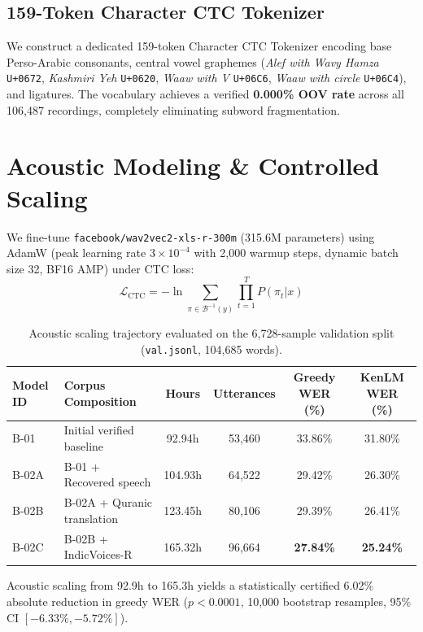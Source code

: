 \documentclass[11pt,a4paper]{article}
\begin{document}
\subsection{159-Token Character CTC Tokenizer}
We construct a dedicated 159-token Character CTC Tokenizer encoding base Perso-Arabic consonants, central vowel graphemes (\textit{Alef with Wavy Hamza} \texttt{U+0672}, \textit{Kashmiri Yeh} \texttt{U+0620}, \textit{Waaw with V} \texttt{U+06C6}, \textit{Waaw with circle} \texttt{U+06C4}), and ligatures. The vocabulary achieves a verified \textbf{0.000\% OOV rate} across all 106,487 recordings, completely eliminating subword fragmentation.

\section{Acoustic Modeling \& Controlled Scaling}
We fine-tune \texttt{facebook/wav2vec2-xls-r-300m} (315.6M parameters) using AdamW (peak learning rate $3 \times 10^{-4}$ with 2,000 warmup steps, dynamic batch size 32, BF16 AMP) under CTC loss:
\begin{equation}
    \mathcal{L}_{\text{CTC}} = -\ln \sum_{\pi \in \mathcal{B}^{-1}(y)} \prod_{t=1}^T P(\pi_t | x)
\end{equation}

\begin{table}[ht]
\centering
\small
\caption{Acoustic scaling trajectory evaluated on the 6,728-sample validation split (\texttt{val.jsonl}, 104,685 words).}
\label{tab:scaling}
\begin{tabular}{llcccc}
\toprule
\textbf{Model ID} & \textbf{Corpus Composition} & \textbf{Hours} & \textbf{Utterances} & \textbf{Greedy WER (\%)} & \textbf{KenLM WER (\%)} \\
\midrule
B-01 & Initial verified baseline & 92.94h & 53,460 & 33.86\% & 31.80\% \\
B-02A & B-01 + Recovered speech & 104.93h & 64,522 & 29.42\% & 26.30\% \\
B-02B & B-02A + Quranic translation & 123.45h & 80,106 & 29.39\% & 26.41\% \\
B-02C & B-02B + IndicVoices-R & 165.32h & 96,664 & \textbf{27.84\%} & \textbf{25.24\%} \\
\bottomrule
\end{tabular}
\end{table}

Acoustic scaling from 92.9h to 165.3h yields a statistically certified 6.02\% absolute reduction in greedy WER ($p < 0.0001$, 10,000 bootstrap resamples, 95\% CI $[-6.33\%, -5.72\%]$).
\end{document}
